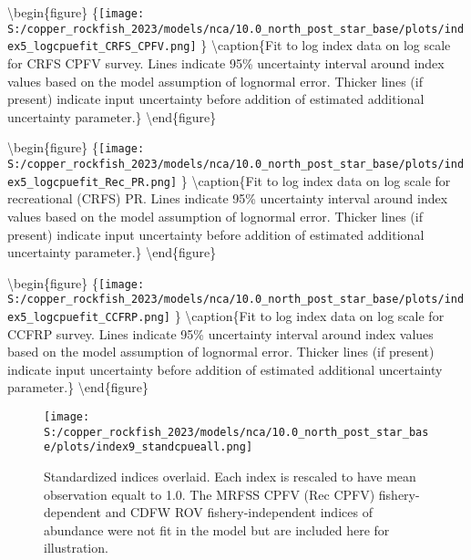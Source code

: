 \documentclass[11pt,
  letterpaper,
]{article}
\begin{document}
\pagebreak

\textbackslash begin\{figure\} \{\centering \texttt{[image: S:/copper\_rockfish\_2023/models/nca/10.0\_north\_post\_star\_base/plots/index5\_logcpuefit\_CRFS\_CPFV.png]} \} \textbackslash caption\{Fit to log index data on log scale for CRFS CPFV survey. Lines indicate 95\% uncertainty interval around index values based on the model assumption of lognormal error. Thicker lines (if present) indicate input uncertainty before addition of estimated additional uncertainty parameter.\label{fig:crfs-cpfv-index-fit}\} \textbackslash end\{figure\}

\pagebreak

\textbackslash begin\{figure\} \{\centering \texttt{[image: S:/copper\_rockfish\_2023/models/nca/10.0\_north\_post\_star\_base/plots/index5\_logcpuefit\_Rec\_PR.png]} \} \textbackslash caption\{Fit to log index data on log scale for recreational (CRFS) PR. Lines indicate 95\% uncertainty interval around index values based on the model assumption of lognormal error. Thicker lines (if present) indicate input uncertainty before addition of estimated additional uncertainty parameter.\label{fig:crfs-pr-index-fit}\} \textbackslash end\{figure\}

\pagebreak

\textbackslash begin\{figure\} \{\centering \texttt{[image: S:/copper\_rockfish\_2023/models/nca/10.0\_north\_post\_star\_base/plots/index5\_logcpuefit\_CCFRP.png]} \} \textbackslash caption\{Fit to log index data on log scale for CCFRP survey. Lines indicate 95\% uncertainty interval around index values based on the model assumption of lognormal error. Thicker lines (if present) indicate input uncertainty before addition of estimated additional uncertainty parameter.\label{fig:ccfrp-index-fit}\} \textbackslash end\{figure\}

\begin{figure}
{\centering
\texttt{[image: S:/copper\_rockfish\_2023/models/nca/10.0\_north\_post\_star\_base/plots/index9\_standcpueall.png]}
}
\caption{Standardized indices overlaid. Each index is rescaled to have mean observation equalt to 1.0. The  MRFSS CPFV (Rec CPFV) fishery-dependent and CDFW ROV fishery-independent indices of abundance were not fit in the model but are included here for illustration.\label{fig:standardized-indices}}
\end{figure}
\end{document}
